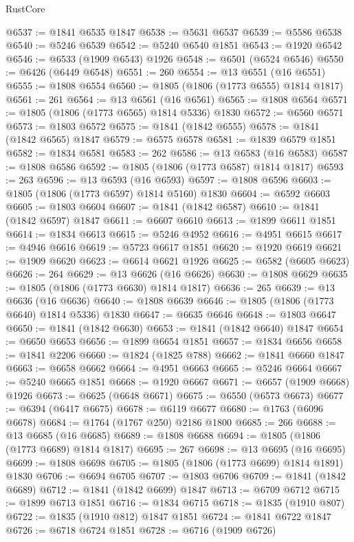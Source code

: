 \begin{lexlean}{RustCore}
\begin{coremodule}
@6537 := @1841 @6535 @1847
@6538 := @5631 @6537
@6539 := @5586 @6538
@6540 := @5246 @6539
@6542 := @5240 @6540 @1851
@6543 := @1920 @6542
@6546 := @6533 (@1909 @6543) @1926
@6548 := @6501 (@6524 @6546)
@6550 := @6426 (@6449 @6548)
@6551 := 260
@6554 := @13 @6551 (@16 @6551)
@6555 := @1808 @6554
@6560 := @1805 (@1806 (@1773 @6555) @1814 @1817)
@6561 := 261
@6564 := @13 @6561 (@16 @6561)
@6565 := @1808 @6564
@6571 := @1805 (@1806 (@1773 @6565) @1814 @5336) @1830
@6572 := @6560 @6571
@6573 := @1803 @6572
@6575 := @1841 (@1842 @6555)
@6578 := @1841 (@1842 @6565) @1847
@6579 := @6575 @6578
@6581 := @1839 @6579 @1851
@6582 := @1834 @6581
@6583 := 262
@6586 := @13 @6583 (@16 @6583)
@6587 := @1808 @6586
@6592 := @1805 (@1806 (@1773 @6587) @1814 @1817)
@6593 := 263
@6596 := @13 @6593 (@16 @6593)
@6597 := @1808 @6596
@6603 := @1805 (@1806 (@1773 @6597) @1814 @5160) @1830
@6604 := @6592 @6603
@6605 := @1803 @6604
@6607 := @1841 (@1842 @6587)
@6610 := @1841 (@1842 @6597) @1847
@6611 := @6607 @6610
@6613 := @1899 @6611 @1851
@6614 := @1834 @6613
@6615 := @5246 @4952
@6616 := @4951 @6615
@6617 := @4946 @6616
@6619 := @5723 @6617 @1851
@6620 := @1920 @6619
@6621 := @1909 @6620
@6623 := @6614 @6621 @1926
@6625 := @6582 (@6605 @6623)
@6626 := 264
@6629 := @13 @6626 (@16 @6626)
@6630 := @1808 @6629
@6635 := @1805 (@1806 (@1773 @6630) @1814 @1817)
@6636 := 265
@6639 := @13 @6636 (@16 @6636)
@6640 := @1808 @6639
@6646 := @1805 (@1806 (@1773 @6640) @1814 @5336) @1830
@6647 := @6635 @6646
@6648 := @1803 @6647
@6650 := @1841 (@1842 @6630)
@6653 := @1841 (@1842 @6640) @1847
@6654 := @6650 @6653
@6656 := @1899 @6654 @1851
@6657 := @1834 @6656
@6658 := @1841 @2206
@6660 := @1824 (@1825 @788)
@6662 := @1841 @6660 @1847
@6663 := @6658 @6662
@6664 := @4951 @6663
@6665 := @5246 @6664
@6667 := @5240 @6665 @1851
@6668 := @1920 @6667
@6671 := @6657 (@1909 @6668) @1926
@6673 := @6625 (@6648 @6671)
@6675 := @6550 (@6573 @6673)
@6677 := @6394 (@6417 @6675)
@6678 := @6119 @6677
@6680 := @1763 (@6096 @6678)
@6684 := @1764 (@1767 @250) @2186 @1800
@6685 := 266
@6688 := @13 @6685 (@16 @6685)
@6689 := @1808 @6688
@6694 := @1805 (@1806 (@1773 @6689) @1814 @1817)
@6695 := 267
@6698 := @13 @6695 (@16 @6695)
@6699 := @1808 @6698
@6705 := @1805 (@1806 (@1773 @6699) @1814 @1891) @1830
@6706 := @6694 @6705
@6707 := @1803 @6706
@6709 := @1841 (@1842 @6689)
@6712 := @1841 (@1842 @6699) @1847
@6713 := @6709 @6712
@6715 := @1899 @6713 @1851
@6716 := @1834 @6715
@6718 := @1835 (@1910 @807)
@6722 := @1835 (@1910 @812) @1847 @1851
@6724 := @1841 @6722 @1847
@6726 := @6718 @6724 @1851
@6728 := @6716 (@1909 @6726)

\end{coremodule}
\end{lexlean}
